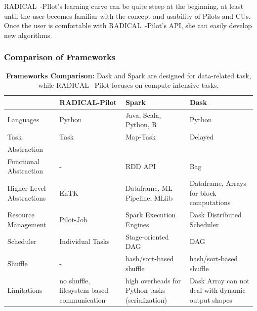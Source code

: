 RADICAL~-PIlot's learning curve can be quite steep at the beginning, at least until the user becomes familiar with the concept and usability of Pilots and CUs.
Once the user is comfortable with RADICAL~-Pilot's API, she can easily develop new algorithms.

\subsubsection{Comparison of Frameworks}
\begin{table}[t]
    \begin{tabular}{@{}p{3cm}|p{3.5cm}p{3.5cm}p{3.5cm}@{}}
        \toprule
        &\textbf{RADICAL-Pilot} &
        \textbf{Spark} &
        \textbf{Dask} \\
        \midrule
        Languages &
        Python &
        Java, Scala, Python, R &
        Python\\
        Task &
        Task &
        Map-Task &
        Delayed\\
        Abstraction &
        &
        & \\
        Functional Abstraction  &
        - &
        RDD API &
        Bag\\
        Higher-Level Abstractions &
        EnTK~\cite{balasubramanian2018harnessing} &
        Dataframe, ML Pipeline, MLlib~\cite{meng2016mllib} &
        Dataframe, Arrays for block computations\\
        Resource Management &
        Pilot-Job &
        Spark Execution Engines &
        Dask Distributed Scheduler\\
        Scheduler    &
        Individual Tasks &
        Stage-oriented DAG &
        DAG\\
        Shuffle      &
        -       &
        hash/sort-based shuffle &
        hash/sort-based shuffle\\
        Limitations &
        no shuffle, filesystem-based communication  &
        high overheads for Python tasks (serialization)   &
        Dask Array can not deal with dynamic output shapes\\
        \bottomrule
    \end{tabular}
    \caption{\textbf{Frameworks Comparison:} Dask and Spark are designed for data-related task, while RADICAL~-Pilot focuses on compute-intensive tasks.\label{tab:frameworks}}
\end{table}

